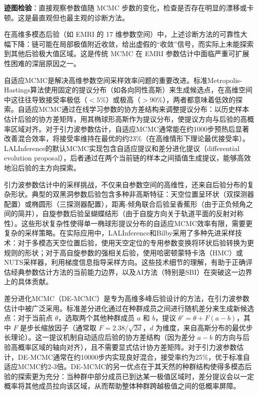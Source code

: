 \textbf{迹图检验}：直接观察参数值随 MCMC 步数的变化，检查是否存在明显的漂移或卡顿。这是最直观但也最主观的诊断方法。

在高维多模态后验（如 EMRI 的 17 维参数空间）中，上述诊断方法的可靠性大幅下降：链可能在局部极值附近收敛，给出虚假的“收敛”信号，而实际上未能探索到其他后验极大值区域。这是传统 MCMC 在 EMRI 参数估计中面临严重可扩展性困难的深层原因之一。

自适应MCMC是解决高维参数空间采样效率问题的重要改进。标准Metropolis-Hastings算法使用固定的提议分布（如各向同性高斯）来生成候选点，在高维空间中这往往导致接受率极低（$<5\%$）或极高（$>90\%$），两者都意味着低效的探索。自适应MCMC通过在线学习参数的协方差结构来调整提议分布：以历史样本估计后验的协方差矩阵，用其椭球形高斯作为提议分布，使提议方向与后验的高概率区域对齐。对于引力波参数估计，自适应MCMC通常能在约1000步预热后显著改善混合效率，将接受率维持在最优的约23\%（在高维情形下理论最优接受率）。LALInference的默认MCMC实现包含自适应提议和差分进化提议（differential evolution proposal），后者通过在两个当前链的样本之间插值生成提议，能够高效地沿后验的主方向探索。

引力波参数估计中的采样挑战，不仅来自参数空间的高维性，还来自后验分布的复杂形状。典型的双黑洞参数后验包含多种非高斯特征：天空位置呈环状（双探测器配置）或椭圆形（三探测器配置），距离-倾角联合后验呈香蕉形（由于正负倾角之间的简并），自旋参数后验呈蝴蝶结形（由于自旋方向关于轨道平面的反射对称性）。这些形状复杂性使得单一椭球形提议分布的自适应MCMC效率有限，需要更复杂的采样策略。在实际应用中，LALInference和Bilby采用了多种先进采样技术：对于多模态天空位置后验，使用天空定位的专用参数变换将环状后验转换为更规则的形状；对于高自旋参数的强相关后验，使用哈密顿蒙特卡洛（HMC）或NUTS采样器，利用梯度信息指导采样方向。这些技术细节的理解，有助于正确评估经典参数估计方法的当前能力边界，以及AI方法（特别是SBI）在突破这一边界上的具体贡献。

差分进化MCMC（DE-MCMC）是专为高维多峰后验设计的方法，在引力波参数估计中被广泛采用。标准差分进化通过在种群成员之间进行随机差分来生成新候选点：对于当前点 $\theta$，选取两个其他种群成员 $a$ 和 $b$，提议 $\theta' = \theta + F(a-b)$，其中 $F$ 是步长缩放因子（通常取 $F=2.38/\sqrt{2d}$，$d$ 为维度，来自高斯分布的最优步长理论）。这一提议机制自动适应后验的协方差结构（因为差分 $a-b$ 的方向与后验高概率区域的轴向对齐），且不需要显式估计协方差矩阵。对于引力波参数估计，DE-MCMC通常在约10000步内实现良好混合，接受率约为25\%，优于标准自适应MCMC约2-3倍。DE-MCMC的另一优点在于其天然的种群结构使得多模态后验的探索更为充分：当种群中部分成员已到达某一极值区域时，差分提议会以一定概率将其他成员拉向该区域，从而帮助整体种群跨越极值之间的低概率屏障。

